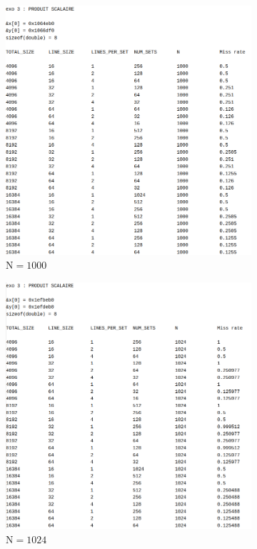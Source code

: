 \documentclass[12pt]{base}
\begin{document}
\begin{figure}[H]
\begin{subfigure}[H]{0.5\linewidth}
    \includegraphics[width=0.75\linewidth]{1_scal_1000.png}
    \caption{$\text{N}=1000$}
    \label{fig:1_1000}
\end{subfigure}
\begin{subfigure}[H]{0.5\linewidth}
    \centering
    \includegraphics[width=0.75\linewidth]{1_scal_1024.png}
    \caption{$\text{N}=1024$}
    \label{fig:1_1024}
\end{subfigure}
\begin{subfigure}[H]{0.5\linewidth}
    \centering

\end{subfigure}
\end{figure}
\end{document}
